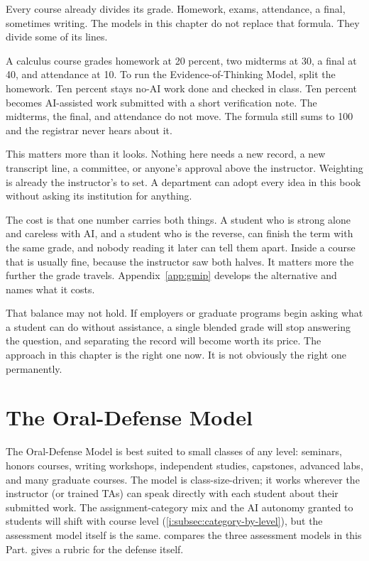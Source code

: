 \documentclass{SIAMbook2023}
\begin{document}
Every course already divides its grade. Homework, exams, attendance, a final, sometimes writing. The models in this chapter do not replace that formula. They divide some of its lines.

A calculus course grades homework at 20 percent, two midterms at 30, a final at 40, and attendance at 10. To run the Evidence-of-Thinking Model, split the homework. Ten percent stays no-AI work done and checked in class. Ten percent becomes AI-assisted work submitted with a short verification note. The midterms, the final, and attendance do not move. The formula still sums to 100 and the registrar never hears about it.

This matters more than it looks. Nothing here needs a new record, a new transcript line, a committee, or anyone's approval above the instructor. Weighting is already the instructor's to set. A department can adopt every idea in this book without asking its institution for anything.

The cost is that one number carries both things. A student who is strong alone and careless with AI, and a student who is the reverse, can finish the term with the same grade, and nobody reading it later can tell them apart. Inside a course that is usually fine, because the instructor saw both halves. It matters more the further the grade travels. Appendix~\ref{app:gmip} develops the alternative and names what it costs.

That balance may not hold. If employers or graduate programs begin asking what a student can do without assistance, a single blended grade will stop answering the question, and separating the record will become worth its price. The approach in this chapter is the right one now. It is not obviously the right one permanently.

\section{The Oral-Defense Model}
\label{i:sec:oral-defense-model}%

The Oral-Defense Model is best suited to small classes of any level: seminars, honors courses, writing workshops, independent studies, capstones, advanced labs, and many graduate courses. The model is class-size-driven; it works wherever the instructor (or trained TAs) can speak directly with each student about their submitted work. The assignment-category mix and the AI autonomy granted to students will shift with course level (\cref{i:subsec:category-by-level}), but the assessment model itself is the same.  compares the three assessment models in this Part.  gives a rubric for the defense itself.
\end{document}
